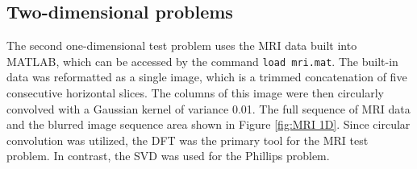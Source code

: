 \documentclass[12pt]{article}
\begin{document}
%
%


\subsection{Two-dimensional problems} \label{sec:2D}
The second one-dimensional test problem uses the MRI data built into MATLAB, which can be accessed by the command \texttt{load mri.mat}. The built-in data was reformatted as a single image, which is a trimmed concatenation of five consecutive horizontal slices. The columns of this image were then circularly convolved with a Gaussian kernel of variance 0.01. The full sequence of MRI data and the blurred image sequence area shown in Figure \ref{fig:MRI 1D}. Since circular convolution was utilized, the DFT was the primary tool for the MRI test problem. In contrast, the SVD was used for the Phillips problem.
\end{document}
